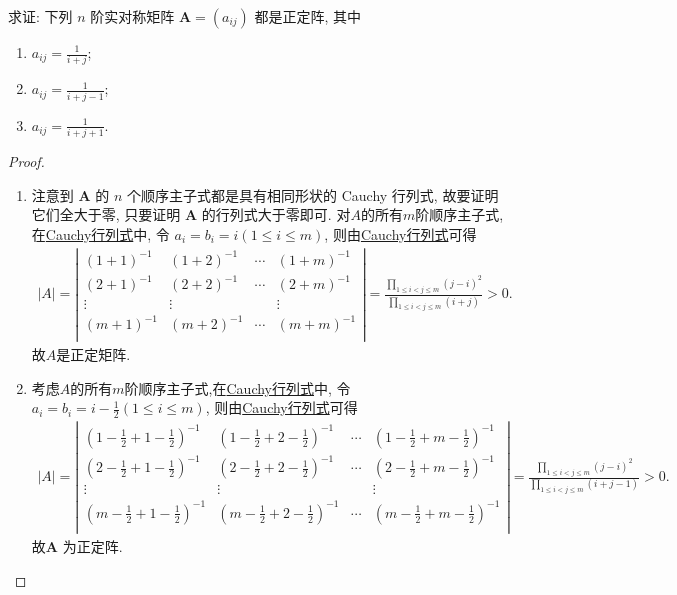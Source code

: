 \documentclass[../../main.tex]{subfiles}
\begin{document}
\begin{example}\label{example:例8.48}
求证: 下列 \(n\) 阶实对称矩阵 \(\boldsymbol{A}=(a_{ij})\) 都是正定阵, 其中
\begin{enumerate}[(1)]
\item \(a_{ij}=\frac{1}{i + j}\);
\item \(a_{ij}=\frac{1}{i + j - 1}\);
\item \(a_{ij}=\frac{1}{i + j + 1}\).
\end{enumerate}
\end{example}
\begin{proof}
\begin{enumerate}[(1)]
\item 注意到 \(\boldsymbol{A}\) 的 \(n\) 个顺序主子式都是具有相同形状的 Cauchy 行列式, 故要证明它们全大于零, 只要证明 \(\boldsymbol{A}\) 的行列式大于零即可. 对$A$的所有$m$阶顺序主子式,在\hyperref[Cauchy行列式]{Cauchy行列式}中, 令 \(a_i = b_i = i(1\leqslant  i\leqslant  m)\), 则由\hyperref[Cauchy行列式]{Cauchy行列式}可得
\begin{align*}
|A|=\left| \begin{matrix}
(1+1)^{-1}&		(1+2)^{-1}&		\cdots&		(1+m)^{-1}\\
(2+1)^{-1}&		(2+2)^{-1}&		\cdots&		(2+m)^{-1}\\
\vdots&		\vdots&		&		\vdots\\
(m+1)^{-1}&		(m+2)^{-1}&		\cdots&		(m+m)^{-1}\\
\end{matrix} \right|=\frac{\prod\limits_{1\leqslant i<j\leqslant m}{\left( j-i \right) ^2}}{\prod\limits_{1\leqslant i<j\leqslant m}{\left( i+j \right)}}>0.
\end{align*}
故$A$是正定矩阵.

\item 考虑$A$的所有$m$阶顺序主子式,在\hyperref[Cauchy行列式]{Cauchy行列式}中, 令 \(a_i = b_i = i-\frac{1}{2}(1\leqslant  i\leqslant  m)\), 则由\hyperref[Cauchy行列式]{Cauchy行列式}可得
\begin{align*}
|A|=\left| \begin{matrix}
(1-\frac{1}{2}+1-\frac{1}{2})^{-1}&		(1-\frac{1}{2}+2-\frac{1}{2})^{-1}&		\cdots&		(1-\frac{1}{2}+m-\frac{1}{2})^{-1}\\
(2-\frac{1}{2}+1-\frac{1}{2})^{-1}&		(2-\frac{1}{2}+2-\frac{1}{2})^{-1}&		\cdots&		(2-\frac{1}{2}+m-\frac{1}{2})^{-1}\\
\vdots&		\vdots&		&		\vdots\\
(m-\frac{1}{2}+1-\frac{1}{2})^{-1}&		(m-\frac{1}{2}+2-\frac{1}{2})^{-1}&		\cdots&		(m-\frac{1}{2}+m-\frac{1}{2})^{-1}\\
\end{matrix} \right|=\frac{\prod\limits_{1\leqslant i<j\leqslant m}{\left( j-i \right) ^2}}{\prod\limits_{1\leqslant i<j\leqslant m}{\left( i+j-1 \right)}}>0.
\end{align*}
故\(\boldsymbol{A}\) 为正定阵.


\end{enumerate}
\end{proof}
\end{document}

